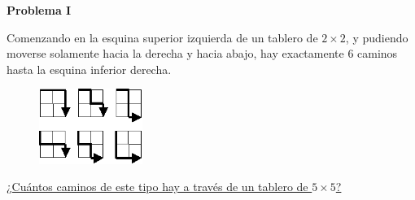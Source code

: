 \begin{center}
\Large \textbf{Problema I} \\
\end{center}

Comenzando en la esquina superior izquierda de un tablero de $2 \times 2$, y pudiendo moverse solamente hacia la derecha y hacia abajo,
hay exactamente $6$ caminos hasta la esquina inferior derecha.

\begin{figure}[H]
    \centering
    \includegraphics[width=0.3\textwidth]{Imagenes/Stock/Caminos en grilla.png}
\end{figure}

\underline{¿Cuántos caminos de este tipo hay a través de un tablero de $5 \times 5$?}


